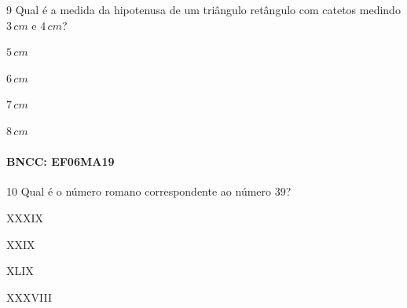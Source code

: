 
\num{9}  Qual é a medida da hipotenusa de um triângulo retângulo com catetos
medindo $3\,cm$ e $4\,cm$?

\begin{escolha}
\item $5\,cm$
\item $6\,cm$
\item $7\,cm$
\item $8\,cm$
\end{escolha}

\paragraph{BNCC: EF06MA19 }


\num{10} Qual é o número romano correspondente ao número $39$?

\begin{escolha}
\item XXXIX 
\item XXIX 
\item XLIX 
\item XXXVIII
\end{escolha}

